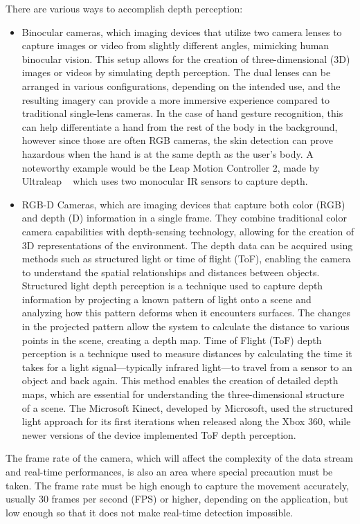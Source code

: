 \documentclass[12pt]{article}
\begin{document}
There are various ways to accomplish depth perception:
\begin{itemize}
  \item Binocular cameras, which imaging devices that utilize two camera lenses to capture images or video from slightly different angles, mimicking human binocular vision. This setup allows for the creation of three-dimensional (3D) images or videos by simulating depth perception. The dual lenses can be arranged in various configurations, depending on the intended use, and the resulting imagery can provide a more immersive experience compared to traditional single-lens cameras. In the case of hand gesture recognition, this can help differentiate a hand from the rest of the body in the background, however since those are often RGB cameras, the skin detection can prove hazardous when the hand is at the same depth as the user's body. A noteworthy example would be the Leap Motion Controller 2, made by Ultraleap ~\cite{LEAPMOTION} which uses two monocular IR sensors to capture depth.
  \item RGB-D Cameras, which are imaging devices that capture both color (RGB) and depth (D) information in a single frame. They combine traditional color camera capabilities with depth-sensing technology, allowing for the creation of 3D representations of the environment. The depth data can be acquired using methods such as structured light or time of flight (ToF), enabling the camera to understand the spatial relationships and distances between objects. Structured light depth perception is a technique used to capture depth information by projecting a known pattern of light onto a scene and analyzing how this pattern deforms when it encounters surfaces. The changes in the projected pattern allow the system to calculate the distance to various points in the scene, creating a depth map. Time of Flight (ToF) depth perception is a technique used to measure distances by calculating the time it takes for a light signal—typically infrared light—to travel from a sensor to an object and back again. This method enables the creation of detailed depth maps, which are essential for understanding the three-dimensional structure of a scene. The Microsoft Kinect, developed by Microsoft, used the structured light approach for its first iterations when released along the Xbox 360, while newer versions of the device implemented ToF depth perception.
\end{itemize}

The frame rate of the camera, which will affect the complexity of the data stream and real-time performances, is also an area where special precaution must be taken. The frame rate must be high enough to capture the movement accurately, usually 30 frames per second (FPS) or higher, depending on the application, but low enough so that it does not make real-time detection impossible.
\end{document}
